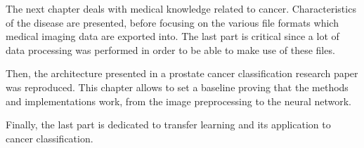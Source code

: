 The next chapter deals with medical knowledge related to cancer. Characteristics of the disease are presented, before focusing on the various file formats which medical imaging data are exported into. The last part is critical since a lot of data processing was performed in order to be able to make use of these files.

Then, the architecture presented in a prostate cancer classification research paper was reproduced. This chapter allows to set a baseline proving that the methods and implementations work, from the image preprocessing to the neural network.

Finally, the last part is dedicated to transfer learning and its application to cancer classification.



